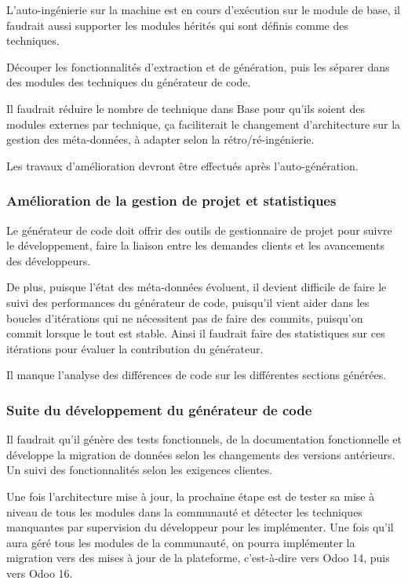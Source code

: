 L’auto-ingénierie sur la machine est en cours d’exécution sur le module de base, il faudrait aussi supporter les modules hérités qui sont définis comme des techniques.

Découper les fonctionnalités d'extraction et de génération, puis les séparer dans des modules des techniques du générateur de code.

Il faudrait réduire le nombre de technique dans Base pour qu’ils soient des modules externes par technique, ça faciliterait le changement d’architecture sur la gestion des méta-données, à adapter selon la rétro/ré-ingénierie.


Les travaux d’amélioration devront être effectués après l’auto-génération.

\subsubsection{Amélioration de la gestion de projet et statistiques}
Le générateur de code doit offrir des outils de gestionnaire de projet pour suivre le développement, faire la liaison entre les demandes clients et les avancements des développeurs.

De plus, puisque l’état des méta-données évoluent, il devient difficile de faire le suivi des performances du générateur de code, puisqu’il vient aider dans les boucles d’itérations qui ne nécessitent pas de faire des commits, puisqu’on commit lorsque le tout est stable. Ainsi il faudrait faire des statistiques sur ces itérations pour évaluer la contribution du générateur.

Il manque l’analyse des différences de code sur les différentes sections générées.

\subsubsection{Suite du développement du générateur de code}
Il faudrait qu’il génère des tests fonctionnels, de la documentation fonctionnelle et développe la migration de données selon les changements des versions antérieurs. Un suivi des fonctionnalités selon les exigences clientes.

Une fois l’architecture mise à jour, la prochaine étape est de tester sa mise à niveau de tous les modules dans la communauté et détecter les techniques manquantes par supervision du développeur pour les implémenter. Une fois qu’il aura géré tous les modules de la communauté, on pourra implémenter la migration vers des mises à jour de la plateforme, c’est-à-dire vers Odoo 14, puis vers Odoo 16.

